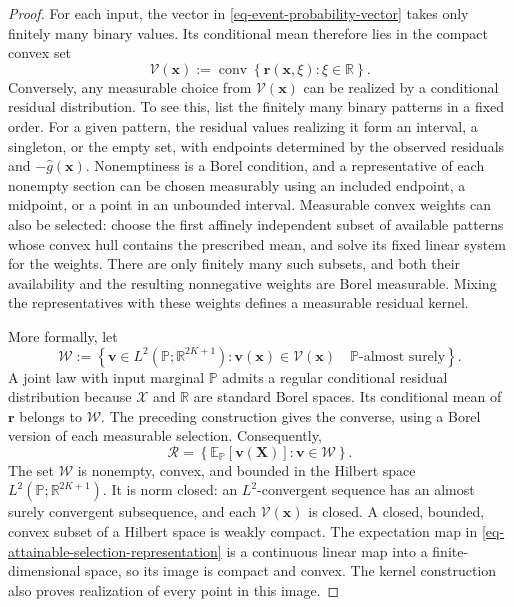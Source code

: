 \begin{proof}
  For each input, the vector in \eqref{eq-event-probability-vector} takes only finitely many binary values. Its conditional mean therefore lies in the compact convex set
  \[
    \mathcal V(\bm x):=\operatorname{conv}\left\{\bm r(\bm x,\xi):\xi\in\mathbb R\right\}.
  \]
  Conversely, any measurable choice from $\mathcal V(\bm x)$ can be realized by a conditional residual distribution. To see this, list the finitely many binary patterns in a fixed order. For a given pattern, the residual values realizing it form an interval, a singleton, or the empty set, with endpoints determined by the observed residuals and $-\hat g(\bm x)$. Nonemptiness is a Borel condition, and a representative of each nonempty section can be chosen measurably using an included endpoint, a midpoint, or a point in an unbounded interval. Measurable convex weights can also be selected: choose the first affinely independent subset of available patterns whose convex hull contains the prescribed mean, and solve its fixed linear system for the weights. There are only finitely many such subsets, and both their availability and the resulting nonnegative weights are Borel measurable. Mixing the representatives with these weights defines a measurable residual kernel.

  More formally, let
  \[
    \mathcal W:=\left\{
      \bm v\in L^2\left(\mathbb P;\mathbb R^{2K+1}\right):
      \bm v(\bm x)\in\mathcal V(\bm x)\quad\mathbb P\text{-almost surely}
    \right\}.
  \]
  A joint law with input marginal $\mathbb P$ admits a regular conditional residual distribution because $\mathcal X$ and $\mathbb R$ are standard Borel spaces. Its conditional mean of $\bm r$ belongs to $\mathcal W$. The preceding construction gives the converse, using a Borel version of each measurable selection. Consequently,
  \begin{equation}
    \mathcal R=\left\{\mathbb E_{\mathbb P}\left[\bm v(\bm X)\right]:\bm v\in\mathcal W\right\}.
    \label{eq-attainable-selection-representation}
  \end{equation}
  The set $\mathcal W$ is nonempty, convex, and bounded in the Hilbert space $L^2\left(\mathbb P;\mathbb R^{2K+1}\right)$. It is norm closed: an $L^2$-convergent sequence has an almost surely convergent subsequence, and each $\mathcal V(\bm x)$ is closed. A closed, bounded, convex subset of a Hilbert space is weakly compact. The expectation map in \eqref{eq-attainable-selection-representation} is a continuous linear map into a finite-dimensional space, so its image is compact and convex. The kernel construction also proves realization of every point in this image.
\end{proof}

